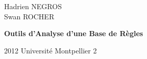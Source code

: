 
{\setlength{\parindent}{0cm}
Hadrien NEGROS \\
Swan ROCHER
}
\vfill
{\centering \Huge \bfseries Outils d'Analyse d'une Base de Règles\par}
\vfill
2012 \hfill Université Montpellier 2
\newpage
 
\setcounter{tocdepth}{1}
\tableofcontents
\thispagestyle{empty}
\newpage

